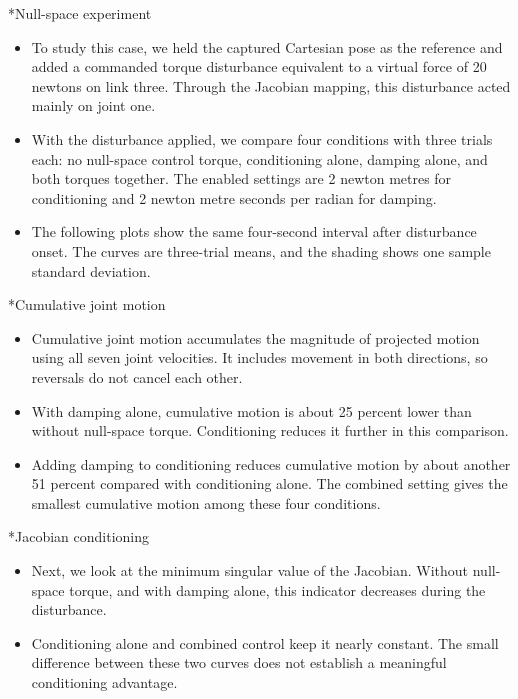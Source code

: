 \documentclass[12pt,a4paper]{article}
\makeatletter
\renewcommand\section{\@startsection{section}{1}{0pt}{14pt}{6pt}{\normalfont\Large\bfseries\color{navy}}}
\makeatother
\begin{document}
\section*{Null-space experiment}
\begin{itemize}
\item To study this case, we held the captured Cartesian pose as the reference and added a commanded torque disturbance equivalent to a virtual force of 20 newtons on link three. Through the Jacobian mapping, this disturbance acted mainly on joint one.
\item With the disturbance applied, we compare four conditions with three trials each: no null-space control torque, conditioning alone, damping alone, and both torques together. The enabled settings are 2 newton metres for conditioning and 2 newton metre seconds per radian for damping.
\item The following plots show the same four-second interval after disturbance onset. The curves are three-trial means, and the shading shows one sample standard deviation.
\end{itemize}

\section*{Cumulative joint motion}
\begin{itemize}
\item Cumulative joint motion accumulates the magnitude of projected motion using all seven joint velocities. It includes movement in both directions, so reversals do not cancel each other.
\item With damping alone, cumulative motion is about 25 percent lower than without null-space torque. Conditioning reduces it further in this comparison.
\item Adding damping to conditioning reduces cumulative motion by about another 51 percent compared with conditioning alone. The combined setting gives the smallest cumulative motion among these four conditions.
\end{itemize}

\section*{Jacobian conditioning}
\begin{itemize}
\item Next, we look at the minimum singular value of the Jacobian. Without null-space torque, and with damping alone, this indicator decreases during the disturbance.
\item Conditioning alone and combined control keep it nearly constant. The small difference between these two curves does not establish a meaningful conditioning advantage.
\end{itemize}
\end{document}
